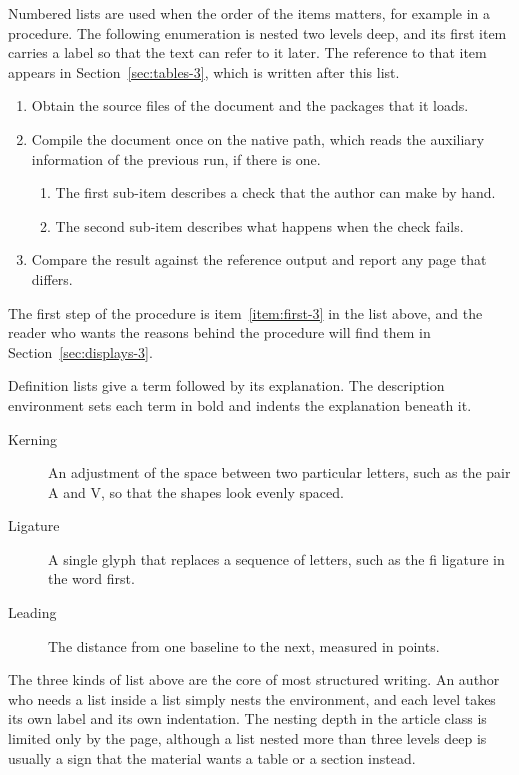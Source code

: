 \documentclass{article}
\begin{document}
Numbered lists are used when the order of the items matters, for example in a
procedure. The following enumeration is nested two levels deep, and its first item
carries a label so that the text can refer to it later. The reference to that item
appears in Section~\ref{sec:tables-3}, which is written after this list.

\begin{enumerate}
  \item\label{item:first-3} Obtain the source files of the document and the packages that
        it loads.
  \item Compile the document once on the native path, which reads the auxiliary
        information of the previous run, if there is one.
        \begin{enumerate}
          \item The first sub-item describes a check that the author can make by hand.
          \item The second sub-item describes what happens when the check fails.
        \end{enumerate}
  \item Compare the result against the reference output and report any page that
        differs.
\end{enumerate}

The first step of the procedure is item~\ref{item:first-3} in the list above, and the
reader who wants the reasons behind the procedure will find them in
Section~\ref{sec:displays-3}.

Definition lists give a term followed by its explanation. The description environment
sets each term in bold and indents the explanation beneath it.

\begin{description}
  \item[Kerning] An adjustment of the space between two particular letters, such as
        the pair A and V, so that the shapes look evenly spaced.
  \item[Ligature] A single glyph that replaces a sequence of letters, such as the
        fi ligature in the word first.
  \item[Leading] The distance from one baseline to the next, measured in points.
\end{description}

The three kinds of list above are the core of most structured writing. An author who
needs a list inside a list simply nests the environment, and each level takes its own
label and its own indentation. The nesting depth in the article class is limited only
by the page, although a list nested more than three levels deep is usually a sign that
the material wants a table or a section instead.
\end{document}
